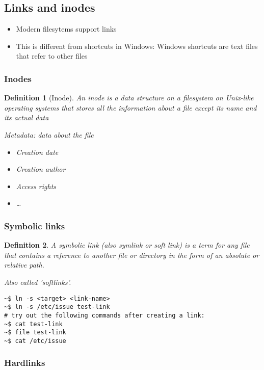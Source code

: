 \documentclass{article}
\newtheorem{theorem}{Definition}[section]
\begin{document}
\subsection{Links and inodes}

\begin{itemize}
    \item Modern filesytems support links
    \item This is different from shortcuts in Windows: Windows shortcuts are text files that refer to other files
\end{itemize}

\subsubsection{Inodes}

\begin{theorem}[Inode]
    An inode is a data structure on a filesystem on Unix-like operating systems that 
    stores all the information about a file except its name and its actual data

    Metadata: data about the file
    \begin{itemize}
        \item Creation date
        \item Creation author
        \item Access rights
        \item \dots
    \end{itemize}
\end{theorem}

\subsubsection{Symbolic links}

\begin{theorem}
    A symbolic link (also symlink or soft link) is a term for any 
    file that contains a reference to another file or directory 
    in the form of an absolute or relative path.

    Also called 'softlinks'.
\end{theorem}

\begin{verbatim}
~$ ln -s <target> <link-name>
~$ ln -s /etc/issue test-link
# try out the following commands after creating a link:
~$ cat test-link
~$ file test-link
~$ cat /etc/issue
\end{verbatim}


\subsubsection{Hardlinks}
\end{document}
